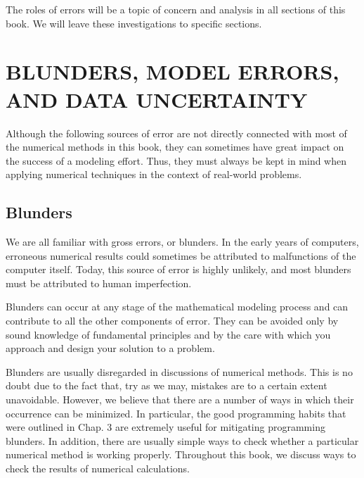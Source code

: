 \documentclass[../main.tex]{subfiles}
\begin{document}
The roles of errors will be a topic of concern and analysis in all sections of this book.
We will leave these investigations to specific sections.\\
\bigskip


\section[BLUNDERS, MODEL ERRORS, AND DATA UNCERTAINTY]{BLUNDERS, MODEL ERRORS, AND DATA UNCERTAINTY}
\noindent
Although the following sources of error are not directly connected with most of the numerical
methods in this book, they can sometimes have great impact on the success of a
modeling effort. Thus, they must always be kept in mind when applying numerical techniques
in the context of real-world problems.\\

\subsection{Blunders}
\noindent
We are all familiar with gross errors, or blunders. In the early years of computers, erroneous
numerical results could sometimes be attributed to malfunctions of the computer itself.
Today, this source of error is highly unlikely, and most blunders must be attributed to human
imperfection.

Blunders can occur at any stage of the mathematical modeling process and can contribute
to all the other components of error. They can be avoided only by sound knowledge
of fundamental principles and by the care with which you approach and design your solution
to a problem.

Blunders are usually disregarded in discussions of numerical methods. This is no doubt
due to the fact that, try as we may, mistakes are to a certain extent unavoidable. However, we
believe that there are a number of ways in which their occurrence can be minimized. In particular,
the good programming habits that were outlined in Chap. 3 are extremely useful for
mitigating programming blunders. In addition, there are usually simple ways to check
whether a particular numerical method is working properly. Throughout this book, we discuss
ways to check the results of numerical calculations.\\
\end{document}

